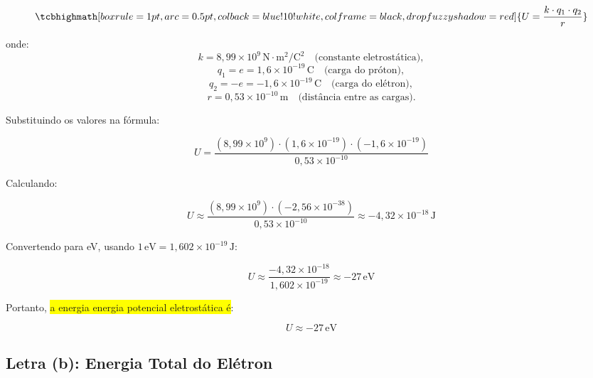 \documentclass[a4paper,12pt]{article}
\begin{document}
\begin{flushleft}
\begin{equation}
    \tcbhighmath[boxrule=1pt,arc=0.5pt,colback=blue!10!white,colframe=black,
      drop fuzzy shadow=red]{U = \frac{k \cdot q_1 \cdot q_2}{r}}
\end{equation}

onde:
\begin{equation}
k = 8,99 \times 10^9 \, \text{N} \cdot \text{m}^2 / \text{C}^2 \quad \text{(constante eletrostática)},
\end{equation}
\begin{equation}
q_1 = e = 1,6 \times 10^{-19} \, \text{C} \quad \text{(carga do próton)},
\end{equation}
\begin{equation}
q_2 = -e = -1,6 \times 10^{-19} \, \text{C} \quad \text{(carga do elétron)},
\end{equation}
\begin{equation}
r = 0,53 \times 10^{-10} \, \text{m} \quad \text{(distância entre as cargas)}.
\end{equation}

Substituindo os valores na fórmula:

\begin{equation}
U = \frac{(8,99 \times 10^9) \cdot (1,6 \times 10^{-19}) \cdot (-1,6 \times 10^{-19})}{0,53 \times 10^{-10}}
\end{equation}

Calculando:

\begin{equation}
U \approx \frac{(8,99 \times 10^9) \cdot (-2,56 \times 10^{-38})}{0,53 \times 10^{-10}} \approx -4,32 \times 10^{-18} \, \text{J}
\end{equation}

Convertendo para eV, usando \( 1 \, \text{eV} = 1,602 \times 10^{-19} \, \text{J} \):

\begin{equation}
U \approx \frac{-4,32 \times 10^{-18}}{1,602 \times 10^{-19}} \approx -27 \, \text{eV}
\end{equation}

Portanto, \colorbox{yellow}{a energia energia potencial eletrostática é}:

\begin{equation}
\boxed{ U \approx -27 \, \text{eV}}
\end{equation}

\subsection*{Letra (b): Energia Total do Elétron}


\end{flushleft}
\end{document}
